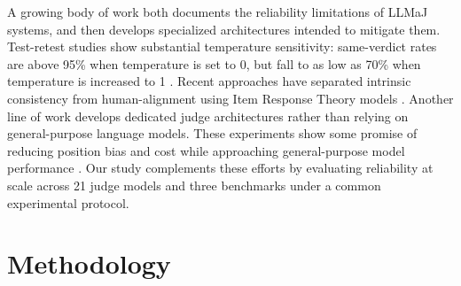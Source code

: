 \documentclass[11pt]{article}
\begin{document}

A growing body of work both documents the reliability limitations of LLMaJ systems, and then develops specialized architectures intended to mitigate them. Test-retest studies show substantial temperature sensitivity: same-verdict rates are above 95\% when temperature is set to 0, but fall to as low as 70\% when temperature is increased to 1 \citep{stureborg2024large, haldar-hockenmaier-2025-rating}. Recent approaches have separated intrinsic consistency from human-alignment using Item Response Theory models \citep{choi2026diagnosing}. Another line of work develops dedicated judge architectures rather than relying on general-purpose language models. These experiments show some promise of reducing position bias \citep{zhu2023judgelm} and cost \citep{verga2024replacing} while approaching general-purpose model performance \citep{kim2024prometheus, kim2024prometheus2}. Our study complements these efforts by evaluating reliability at scale across 21 judge models and three benchmarks under a common experimental protocol.




\section{Methodology}
\label{sec:Methods}
\end{document}

